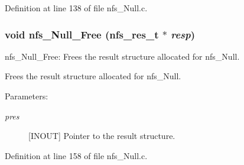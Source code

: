 Definition at line 138 of file nfs\_\-Null.c.
\subsubsection{\setlength{\rightskip}{0pt plus 5cm}void nfs\_\-Null\_\-Free (nfs\_\-res\_\-t $\ast$ {\em resp})}\label{nfs__Null_8c_a1}


nfs\_\-Null\_\-Free: Frees the result structure allocated for nfs\_\-Null.

Frees the result structure allocated for nfs\_\-Null.

\begin{Desc}
\item[Parameters:]
\begin{description}
\item[{\em pres}][INOUT] Pointer to the result structure. \end{description}
\end{Desc}


Definition at line 158 of file nfs\_\-Null.c.